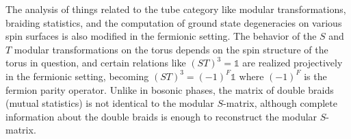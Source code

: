 \documentclass[12pt,a4paper]{article}
\newcommand{\unit}{\mathds{1}}
\newcommand{\kw}[1]{{\color{kwcolor}\footnotesize{(KW) #1}}}
\newcommand{\dave}[1]{{\color{ao(english)}\footnotesize{(DA) #1}}}
\newcommand{\ethan}[1]{{\color{amethyst}\footnotesize{(EL) #1}}}
\begin{document}

The analysis of things related to the tube category like modular transformations, braiding statistics, and the computation of ground state degeneracies on various spin surfaces
is also modified in the fermionic setting.  
The behavior of the $S$ and $T$ modular transformations on the torus depends on the spin structure of the torus in question, and 
certain relations like $(ST)^3 = \unit$ are realized projectively in the fermionic setting, becoming 
$(ST)^3=(-1)^F\unit$ where $(-1)^F$ is the fermion parity operator.
Unlike in bosonic phases, the matrix of double braids (mutual statistics) is not identical to the 
modular $S$-matrix, although complete information about the double braids 
is enough to reconstruct the modular $S$-matrix. 
\end{document}
